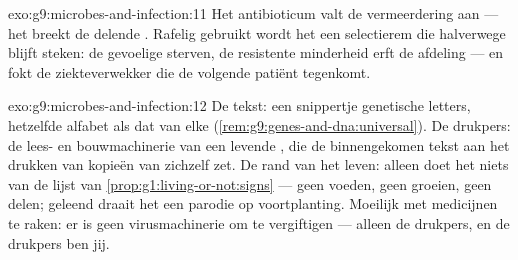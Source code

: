 \begin{solution}{exo:g9:microbes-and-infection:11}
Het antibioticum valt de vermeerdering aan --- het breekt de
delende . Rafelig gebruikt wordt het een selectierem die
halverwege blijft steken: de gevoelige  sterven, de
resistente minderheid erft de afdeling --- en fokt de
ziekteverwekker die de volgende patiënt tegenkomt.
\end{solution}

\begin{solution}{exo:g9:microbes-and-infection:12}
De tekst: een snippertje genetische letters, hetzelfde alfabet als
dat van elke  (\cref{rem:g9:genes-and-dna:universal}). De
drukpers: de lees- en bouwmachinerie van een levende , die de
binnengekomen tekst aan het drukken van kopieën van zichzelf zet.
De rand van het leven: alleen doet het  niets van de lijst van
\cref{prop:g1:living-or-not:signs} --- geen voeden, geen groeien,
geen delen; geleend draait het een parodie op voortplanting.
Moeilijk met medicijnen te raken: er is geen virusmachinerie om te
vergiftigen --- alleen de drukpers, en de drukpers ben jij.
\end{solution}

